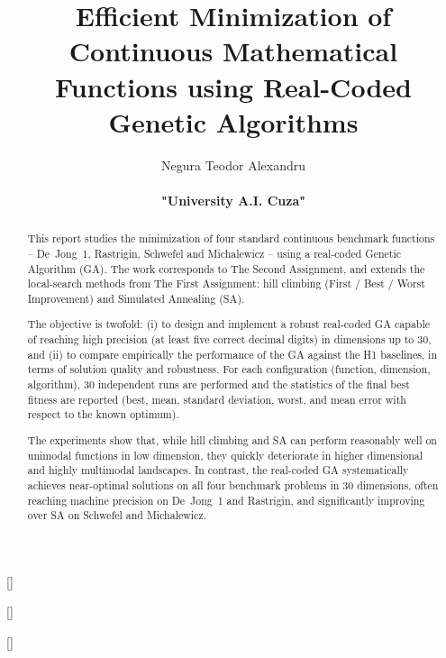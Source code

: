\documentclass[a4paper,11pt]{article}
\title{\textbf{Efficient Minimization of Continuous Mathematical Functions using Real-Coded Genetic Algorithms}}
\author{Negura Teodor Alexandru \\ \\ \textbf{"University A.I. Cuza"}}
\date{}
\begin{document}
\titleformat{\section}{\centering\normalfont\huge\bfseries}{}{0em}{}[\vspace{0.5em}]
\titleformat{\subsection}{\centering\normalfont\Large\bfseries}{}{0em}{}[\vspace{0.3em}]
\titleformat{\subsubsection}{\centering\normalfont\large\bfseries}{}{0em}{}[\vspace{0.2em}]
\titlespacing*{\section}{0pt}{2em}{1.5em}
\titlespacing*{\subsection}{0pt}{1.5em}{1em}
\titlespacing*{\subsubsection}{0pt}{1em}{0.5em}
\maketitle
\thispagestyle{empty}

\begin{abstract}
This report studies the minimization of four standard continuous benchmark functions --
De~Jong~1, Rastrigin, Schwefel and Michalewicz -- using a real-coded Genetic Algorithm (GA).
The work corresponds to The Second Assignment, and extends the local-search methods from
The First Assignment: hill climbing (First / Best / Worst Improvement) and Simulated Annealing (SA).

The objective is twofold: 
(i) to design and implement a robust real-coded GA capable of
reaching high precision (at least five correct decimal digits) in dimensions up to 30, and
(ii) to compare empirically the performance of the GA against the H1 baselines, in terms
of solution quality and robustness. For each configuration (function, dimension, algorithm),
30 independent runs are performed and the statistics of the final best fitness are reported
(best, mean, standard deviation, worst, and mean error with respect to the known optimum).

The experiments show that, while hill climbing and SA can perform reasonably well on
unimodal functions in low dimension, they quickly deteriorate in higher dimensional and
highly multimodal landscapes. In contrast, the real-coded GA systematically achieves
near-optimal solutions on all four benchmark problems in 30 dimensions, often reaching
machine precision on De~Jong~1 and Rastrigin, and significantly improving over SA on
Schwefel and Michalewicz.
\end{abstract}
\end{document}
